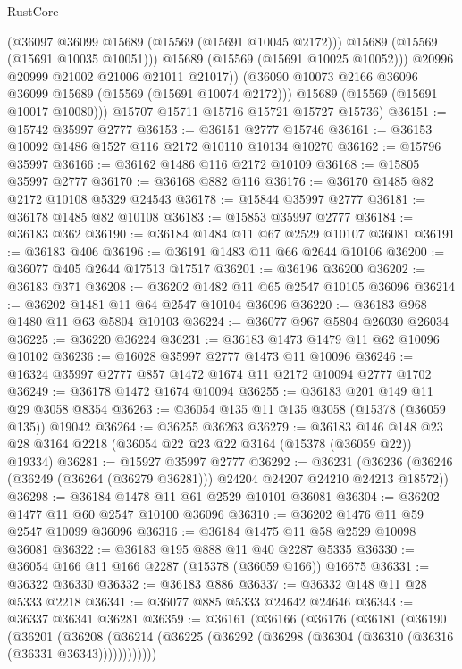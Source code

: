 \begin{lexlean}{RustCore}
\begin{coremodule}
                (@36097 @36099 @15689 (@15569 (@15691 @10045 @2172)))
                @15689
                (@15569 (@15691 @10035 @10051)))
              @15689
              (@15569 (@15691 @10025 @10052)))
            @20996
            @20999
            @21002
            @21006
            @21011
            @21017))
        (@36090 @10073 @2166 @36096 @36099 @15689 (@15569 (@15691 @10074 @2172)))
        @15689
        (@15569 (@15691 @10017 @10080)))
      @15707
      @15711
      @15716
      @15721
      @15727
      @15736)
@36151 := @15742 @35997 @2777
@36153 := @36151 @2777 @15746
@36161 := @36153 @10092 @1486 @1527 @116 @2172 @10110 @10134 @10270
@36162 := @15796 @35997
@36166 := @36162 @1486 @116 @2172 @10109
@36168 := @15805 @35997 @2777
@36170 := @36168 @882 @116
@36176 := @36170 @1485 @82 @2172 @10108 @5329 @24543
@36178 := @15844 @35997 @2777
@36181 := @36178 @1485 @82 @10108
@36183 := @15853 @35997 @2777
@36184 := @36183 @362
@36190 := @36184 @1484 @11 @67 @2529 @10107 @36081
@36191 := @36183 @406
@36196 := @36191 @1483 @11 @66 @2644 @10106
@36200 := @36077 @405 @2644 @17513 @17517
@36201 := @36196 @36200
@36202 := @36183 @371
@36208 := @36202 @1482 @11 @65 @2547 @10105 @36096
@36214 := @36202 @1481 @11 @64 @2547 @10104 @36096
@36220 := @36183 @968 @1480 @11 @63 @5804 @10103
@36224 := @36077 @967 @5804 @26030 @26034
@36225 := @36220 @36224
@36231 := @36183 @1473 @1479 @11 @62 @10096 @10102
@36236 := @16028 @35997 @2777 @1473 @11 @10096
@36246 := @16324 @35997 @2777 @857 @1472 @1674 @11 @2172 @10094 @2777 @1702
@36249 := @36178 @1472 @1674 @10094
@36255 := @36183 @201 @149 @11 @29 @3058 @8354
@36263 := @36054 @135 @11 @135 @3058 (@15378 (@36059 @135)) @19042
@36264 := @36255 @36263
@36279 := @36183
    @146
    @148
    @23
    @28
    @3164
    @2218
    (@36054 @22 @23 @22 @3164 (@15378 (@36059 @22)) @19334)
@36281 := @15927 @35997 @2777
@36292 := @36231
    (@36236 (@36246 (@36249 (@36264 (@36279 @36281))) @24204 @24207 @24210 @24213 @18572))
@36298 := @36184 @1478 @11 @61 @2529 @10101 @36081
@36304 := @36202 @1477 @11 @60 @2547 @10100 @36096
@36310 := @36202 @1476 @11 @59 @2547 @10099 @36096
@36316 := @36184 @1475 @11 @58 @2529 @10098 @36081
@36322 := @36183 @195 @888 @11 @40 @2287 @5335
@36330 := @36054 @166 @11 @166 @2287 (@15378 (@36059 @166)) @16675
@36331 := @36322 @36330
@36332 := @36183 @886
@36337 := @36332 @148 @11 @28 @5333 @2218
@36341 := @36077 @885 @5333 @24642 @24646
@36343 := @36337 @36341 @36281
@36359 := @36161
    (@36166
      (@36176
        (@36181
          (@36190
            (@36201
              (@36208
                (@36214 (@36225 (@36292 (@36298 (@36304 (@36310 (@36316 (@36331 @36343))))))))))))

\end{coremodule}
\end{lexlean}
